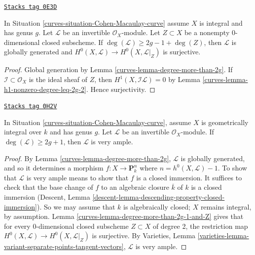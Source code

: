 \begin{lemma}
\label{curves-lemma-degree-more-than-2g-1-and-Z}
\href{https://stacks.math.columbia.edu/tag/0E3D}{\texttt{Stacks tag 0E3D}}

In Situation \ref{curves-situation-Cohen-Macaulay-curve}
assume $X$ is integral and has genus $g$.
Let $\mathcal{L}$ be an invertible $\mathcal{O}_X$-module.
Let $Z \subset X$ be a nonempty $0$-dimensional closed subscheme.
If $\deg(\mathcal{L}) \geq 2g - 1 + \deg(Z)$, then $\mathcal{L}$
is globally generated and $H^0(X, \mathcal{L}) \to H^0(X, \mathcal{L}|_Z)$
is surjective.
\end{lemma}

\begin{proof}

Global generation by Lemma \ref{curves-lemma-degree-more-than-2g}.
If $\mathcal{I} \subset \mathcal{O}_X$ is the ideal sheaf
of $Z$, then $H^1(X, \mathcal{I}\mathcal{L}) = 0$ by
Lemma \ref{curves-lemma-h1-nonzero-degree-leq-2g-2}. Hence surjectivity.
\end{proof}

\begin{lemma}
\label{curves-lemma-degree-at-least-2g+1}
\href{https://stacks.math.columbia.edu/tag/0H2V}{\texttt{Stacks tag 0H2V}}

In Situation \ref{curves-situation-Cohen-Macaulay-curve},
assume $X$ is geometrically integral over $k$ and has genus $g$.
Let $\mathcal{L}$ be an invertible $\mathcal{O}_X$-module.
If $\deg(\mathcal{L}) \geq 2g + 1$, then $\mathcal{L}$
is very ample.
\end{lemma}

\begin{proof}

By Lemma \ref{curves-lemma-degree-more-than-2g}, $\mathcal{L}$
is globally generated, and so it determines a morphism
$f : X \to \mathbf{P}^n_k$ where $n = h^0(X,\mathcal{L}) - 1$. To show that
$\mathcal{L}$ is very ample means to show that
$f$ is a closed immersion. It suffices to check that the base change
of $f$ to an algebraic closure $\overline{k}$ of $k$ is a closed immersion
(Descent, Lemma \ref{descent-lemma-descending-property-closed-immersion}).
So we may assume that $k$ is algebraically closed; $X$ remains
integral, by assumption. Lemma \ref{curves-lemma-degree-more-than-2g-1-and-Z}
gives that for every $0$-dimensional closed subscheme
$Z\subset X$ of degree 2,
the restriction map $H^0(X, \mathcal{L}) \to H^0(X, \mathcal{L}|_Z)$
is surjective. By Varieties, Lemma
\ref{varieties-lemma-variant-separate-points-tangent-vectors},
$\mathcal{L}$ is very ample.
\end{proof}



